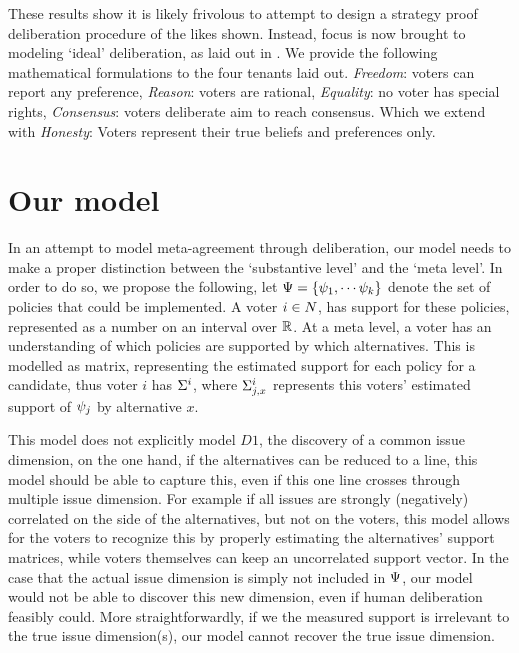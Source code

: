 These results show it is likely frivolous to attempt to design a strategy proof
deliberation procedure of the likes shown. Instead, focus is now brought to
modeling `ideal' deliberation, as laid out in .
We provide the following mathematical formulations to the four tenants laid
out. \emph{Freedom}: voters can report any preference, \emph{Reason}: voters
are rational, \emph{Equality}: no voter has special rights, \emph{Consensus}:
voters deliberate aim to reach consensus. Which we extend with \emph{Honesty}:
Voters represent their true beliefs and preferences only.


\section{Our model} \label{sec: main model}

In an attempt to model meta-agreement through deliberation, our model needs to
make a proper distinction between the `substantive level' and the `meta level'.
In order to do so, we propose the following, let \(\Psi = \{\psi_{1},
\cdots \psi_{k}\}\) denote the set of policies that could be implemented. A
voter $i \in N$, has support for these policies, represented as a number
on an interval over $\mathbb{R}$. At a meta level, a voter has an understanding of
which policies are supported by which alternatives. This is modelled as matrix,
representing the estimated support for each policy for a candidate, thus voter
$i$ has $\Sigma^i$, where $\Sigma^i_{j, x}$ represents this voters'
estimated support of $\psi_j$ by alternative $x$.

This model does not explicitly model $D1$, the discovery of a common issue
dimension, on the one hand, if the alternatives can be reduced to a line, this
model should be able to capture this, even if this one line crosses through
multiple issue dimension. For example if all issues are strongly (negatively)
correlated on the side of the alternatives, but not on the voters, this model
allows for the voters to recognize this by properly estimating the
alternatives' support matrices, while voters themselves can keep an
uncorrelated support vector. In the case that the actual issue dimension is
simply not included in $\Psi$, our model would not be able to discover
this new dimension, even if human deliberation feasibly could. More
straightforwardly, if we the measured support is irrelevant to the true issue
dimension(s), our model cannot recover the true issue dimension.

